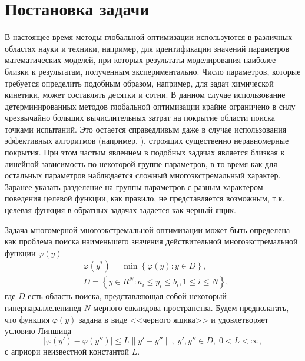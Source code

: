 \documentclass[11pt, oneside, a4paper]{article}
\begin{document}
\section{Постановка задачи}

В настоящее время методы глобальной оптимизации используются в различных областях науки и техники, например, для идентификации значений параметров математических моделей, при которых результаты моделирования наиболее близки к результатам, полученным экспериментально.
Число параметров, которые требуется определить подобным образом, например, для задач химической кинетики, может составлять десятки и сотни. В данном случае использование детерминированных методов глобальной оптимизации крайне ограничено в силу чрезвычайно больших вычислительных затрат на покрытие области поиска точками испытаний. Это остается справедливым даже в случае использования эффективных алгоритмов (например, \cite{Evtushenko2009,Paulavicius2016}), строящих существенно неравномерные покрытия. 
При этом частым явлением в подобных задачах является близкая к линейной зависимость по некоторой группе параметров, в то время как для остальных параметров наблюдается сложный многоэкстремальный характер. Заранее указать разделение на группы параметров с разным характером поведения целевой функции, как правило, не представляется возможным, т.к. целевая функция в обратных задачах задается как черный ящик. 

Задача многомерной многоэкстремальной оптимизации может быть определена как проблема поиска наименьшего значения действительной многоэкстремальной функции $\varphi(y)$
\begin{eqnarray}\label{main_problem}
& \varphi(y^\ast)=\min{\left\{\varphi(y): y\in D\right\}},  \\
& D=\left\{y\in R^N: a_i\leq y_i \leq b_i, 1\leq i \leq N\right\}, \nonumber
\end{eqnarray}
где $D$ есть область поиска, представляющая собой некоторый гиперпараллелепипед $N$-мерного евклидова пространства.
Будем предполагать, что функция $\varphi(y)$ задана в виде <<черного ящика>> и удовлетворяет условию Липшица
\[
\left|\varphi(y')-\varphi(y'')\right|\leq L\left\|y'-y''\right\|,\; y',y'' \in D,\; 0<L<\infty,
\]
с априори неизвестной константой $L$.
\end{document}
